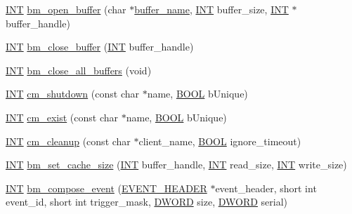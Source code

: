 \begin{DoxyCompactItemize}
\item 
\hyperlink{vppg_8h_a392e62da233ed3e2f7c3fd4f487a3896}{INT} \hyperlink{group__bmfunctionc_gae9636ff3e34ee94e31cb292bd07a679d}{bm\_\-open\_\-buffer} (char $\ast$\hyperlink{mevb_8c_a93bc09c1f5f9f26a081d11962971f301}{buffer\_\-name}, \hyperlink{vppg_8h_a392e62da233ed3e2f7c3fd4f487a3896}{INT} buffer\_\-size, \hyperlink{vppg_8h_a392e62da233ed3e2f7c3fd4f487a3896}{INT} $\ast$buffer\_\-handle)
\item 
\hyperlink{vppg_8h_a392e62da233ed3e2f7c3fd4f487a3896}{INT} \hyperlink{group__bmfunctionc_ga7b2cbde6caa572dfc978c780d63ab6be}{bm\_\-close\_\-buffer} (\hyperlink{vppg_8h_a392e62da233ed3e2f7c3fd4f487a3896}{INT} buffer\_\-handle)
\item 
\hyperlink{vppg_8h_a392e62da233ed3e2f7c3fd4f487a3896}{INT} \hyperlink{group__bmfunctionc_ga3a2dae045156606fc157e01a82983a25}{bm\_\-close\_\-all\_\-buffers} (void)
\item 
\hyperlink{vppg_8h_a392e62da233ed3e2f7c3fd4f487a3896}{INT} \hyperlink{group__cmfunctionc_ga01682993f1aa1d5a4ed22de45ecf45fe}{cm\_\-shutdown} (const char $\ast$name, \hyperlink{vt2_8h_a239c7f0d40651c3e419c5b9651507d14}{BOOL} bUnique)
\item 
\hyperlink{vppg_8h_a392e62da233ed3e2f7c3fd4f487a3896}{INT} \hyperlink{group__cmfunctionc_gafb034d850f13190ba256f235fcea5298}{cm\_\-exist} (const char $\ast$name, \hyperlink{vt2_8h_a239c7f0d40651c3e419c5b9651507d14}{BOOL} bUnique)
\item 
\hyperlink{vppg_8h_a392e62da233ed3e2f7c3fd4f487a3896}{INT} \hyperlink{group__cmfunctionc_ga6208deae04212a3f234d80fe3185f86d}{cm\_\-cleanup} (const char $\ast$client\_\-name, \hyperlink{vt2_8h_a239c7f0d40651c3e419c5b9651507d14}{BOOL} ignore\_\-timeout)
\item 
\hyperlink{vppg_8h_a392e62da233ed3e2f7c3fd4f487a3896}{INT} \hyperlink{group__bmfunctionc_ga2689ca85c6d0023f1a02e6827a5eff6e}{bm\_\-set\_\-cache\_\-size} (\hyperlink{vppg_8h_a392e62da233ed3e2f7c3fd4f487a3896}{INT} buffer\_\-handle, \hyperlink{vppg_8h_a392e62da233ed3e2f7c3fd4f487a3896}{INT} read\_\-size, \hyperlink{vppg_8h_a392e62da233ed3e2f7c3fd4f487a3896}{INT} write\_\-size)
\item 
\hyperlink{vppg_8h_a392e62da233ed3e2f7c3fd4f487a3896}{INT} \hyperlink{group__bmfunctionc_gac5e3e469fb6721a502ebd80a35a328f5}{bm\_\-compose\_\-event} (\hyperlink{structEVENT__HEADER}{EVENT\_\-HEADER} $\ast$event\_\-header, short int event\_\-id, short int trigger\_\-mask, \hyperlink{vt2_8h_a798af1e30bc65f319c1a246cecf59e39}{DWORD} size, \hyperlink{vt2_8h_a798af1e30bc65f319c1a246cecf59e39}{DWORD} serial)

\end{DoxyCompactItemize}

